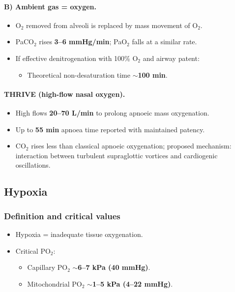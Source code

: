 \documentclass[11pt,a4paper]{article}
\begin{document}
\paragraph{B) Ambient gas = oxygen.}
\begin{itemize}
  \item O$_2$ removed from alveoli is replaced by mass movement of O$_2$.
  \item PaCO$_2$ rises \textbf{3--6 mmHg/min}; PaO$_2$ falls at a similar rate.
  \item If effective denitrogenation with 100\% O$_2$ and airway patent:
  \begin{itemize}
    \item Theoretical non-desaturation time $\sim$\textbf{100 min}.
  \end{itemize}
\end{itemize}

\paragraph{THRIVE (high-flow nasal oxygen).}
\begin{itemize}
  \item High flows \textbf{20--70 L/min} to prolong apnoeic mass oxygenation.
  \item Up to \textbf{55 min} apnoea time reported with maintained patency.
  \item CO$_2$ rises less than classical apnoeic oxygenation; proposed mechanism: interaction between turbulent supraglottic vortices and cardiogenic oscillations.
\end{itemize}

\subsection{Hypoxia}

\subsubsection{Definition and critical values}
\begin{itemize}
  \item Hypoxia = inadequate tissue oxygenation.
  \item Critical PO$_2$:
  \begin{itemize}
    \item Capillary PO$_2$ $\sim$\textbf{6--7 kPa (40 mmHg)}.
    \item Mitochondrial PO$_2$ $\sim$\textbf{1--5 kPa (4--22 mmHg)}.
  \end{itemize}
\end{itemize}
\end{document}
